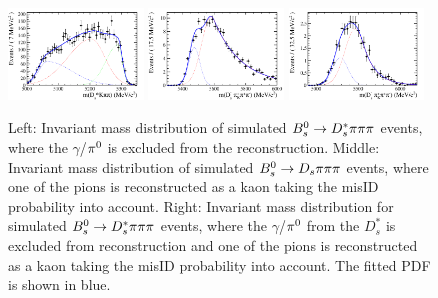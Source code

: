 %

\begin{figure}[h]
\centering
\includegraphics[height=!,width=0.32\textwidth]{figs/Bs2Dsstartpipipi.pdf}
\includegraphics[height=!,width=0.32\textwidth]{figs/Bs2Dspipipi_as_DsKpipi.pdf}
\includegraphics[height=!,width=0.32\textwidth]{figs/Bs2Dsstarpipipi_as_DsKpipi.pdf}
\caption{
Left: Invariant mass distribution of simulated ${{B}^0_{s}}\rightarrow D_s^{*}{\pi}{\pi}{\pi}$ events, where the $\gamma$/${{\pi}^0}$ is excluded from the reconstruction. 
Middle: Invariant mass distribution of  simulated ${{B}^0_{s}}\rightarrow{\ensuremath{{D}_{s}}}{\ensuremath{\pi}}{\ensuremath{\pi}}{\ensuremath{\pi}}$ events, where one of the pions is reconstructed as a kaon taking the misID probability into account. 
Right: Invariant mass distribution for simulated ${{B}^0_{s}}\rightarrow D_s^{*}{\pi}{\pi}{\pi}$ events, where the $\gamma$/${{\pi}^0}$ from the $D_s^{*}$ is excluded from reconstruction
and one of the pions is reconstructed as a kaon taking the misID probability into account. The fitted PDF is shown in blue.}
\label{fig: BsDspipipiMCmissID}
\end{figure}
 

